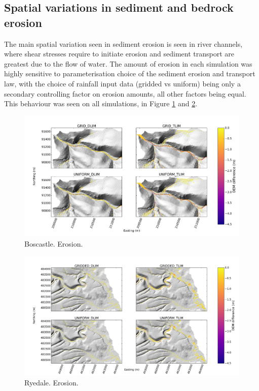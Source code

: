 \subsection{Spatial variations in sediment and bedrock erosion}
The main spatial variation seen in sediment erosion is seen in river channels, where shear stresses require to initiate erosion and sediment transport are greatest due to the flow of water. The amount of erosion in each simulation was highly sensitive to parameterisation choice of the sediment erosion and transport law, with the choice of rainfall input data (gridded vs uniform) being only a secondary controlling factor on erosion amounts, all other factors being equal. This behaviour was seen on all simulations, in Figure \ref{fig_boscastle_2dplan_erosion_ensemble} and \ref{fig_ryedale_2dplan_erosion_ensemble}. 

\begin{figure}
\includegraphics[width=25cm]{chp06_figures_scripts/figure_boscastle_erosion_diff_ensemble10.jpg}
\caption{Boscastle. Erosion.}
\label{fig_boscastle_2dplan_erosion_ensemble}
\end{figure}

\begin{figure}
\includegraphics[width=25cm]{chp06_figures_scripts/figure_ryedale_erosion_diff_ensemble30.jpg}
\caption{Ryedale. Erosion.}
\label{fig_ryedale_2dplan_erosion_ensemble}
\end{figure}


